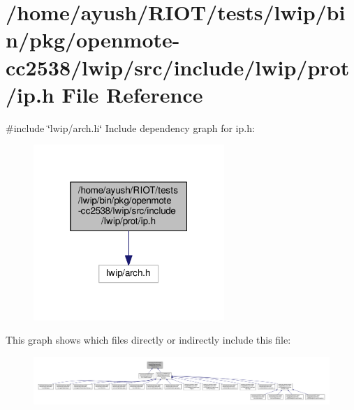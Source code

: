 \hypertarget{openmote-cc2538_2lwip_2src_2include_2lwip_2prot_2ip_8h}{}\section{/home/ayush/\+R\+I\+O\+T/tests/lwip/bin/pkg/openmote-\/cc2538/lwip/src/include/lwip/prot/ip.h File Reference}
\label{openmote-cc2538_2lwip_2src_2include_2lwip_2prot_2ip_8h}
{\ttfamily \#include \char`\"{}lwip/arch.\+h\char`\"{}}\newline
Include dependency graph for ip.\+h\+:
\nopagebreak
\begin{figure}[H]
\begin{center}
\leavevmode
\includegraphics[width=205pt]{openmote-cc2538_2lwip_2src_2include_2lwip_2prot_2ip_8h__incl}
\end{center}
\end{figure}
This graph shows which files directly or indirectly include this file\+:
\nopagebreak
\begin{figure}[H]
\begin{center}
\leavevmode
\includegraphics[width=350pt]{openmote-cc2538_2lwip_2src_2include_2lwip_2prot_2ip_8h__dep__incl}
\end{center}
\end{figure}
